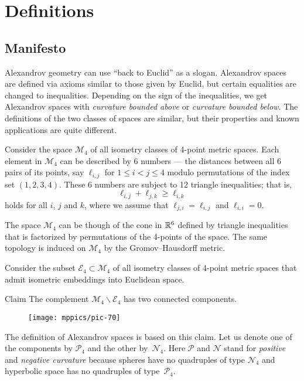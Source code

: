 \chapter{Definitions}

\section{Manifesto}

Alexandrov geometry can use ``back to Euclid'' as a slogan.
Alexandrov spaces are defined via axioms similar to those given by Euclid,
but certain  equalities are changed to inequalities. 
Depending on the sign of the inequalities, we get Alexandrov spaces with \emph{curvature bounded above} or \emph{curvature bounded below}.
The definitions of the two classes of spaces are similar, but their properties and known applications are quite different.


Consider the space $\mathcal{M}_4$ of all isometry classes of 4-point metric spaces.
Each element in $\mathcal{M}_4$ can be described by 6 numbers 
 --- the distances between all 6 pairs of its points, say $\ell_{i,j}$ for $1\le i< j\le 4$ modulo permutations of the index set $(1,2,3,4)$.
These 6 numbers are subject to 12 triangle inequalities; that is,
\[\ell_{i,j}+\ell_{j,k}\ge \ell_{i,k}\]
holds for all $i$, $j$ and $k$, where we assume that $\ell_{j,i}=\ell_{i,j}$ and $\ell_{i,i}=0$.

The space $\mathcal{M}_4$ can be though of the cone in $\mathbb{R}^6$ defined by triangle inequalities that is factorized by permutations of the 4-points of the space.
The same topology is induced on $\mathcal{M}_4$ by the Gromov--Hausdorff metric.

Consider the subset $\mathcal{E}_4\subset \mathcal{M}_4$ of all isometry classes of 4-point metric spaces that admit isometric embeddings into Euclidean space.

\begin{thm}{Claim}\label{clm:two-components-of-M4}
The complement $\mathcal{M}_4\backslash \mathcal{E}_4$ has two connected components.
\end{thm}

\begin{wrapfigure}{o}{33mm}
\vskip-0mm
\centering
\texttt{[image: mppics/pic-70]}
\end{wrapfigure}

The definition of Alexandrov spaces is based on this claim.
Let us denote one of the components by $\mathcal{P}_4$ and the other by~$\mathcal{N}_4$.
Here $\mathcal{P}$ and $\mathcal{N}$ stand for {}\emph{positive} 
and {}\emph{negative curvature} because spheres have no quadruples of type $\mathcal{N}_4$ and 
hyperbolic space
has no quadruples of type~$\mathcal{P}_4$.


